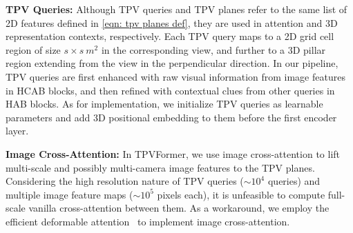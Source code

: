 \documentclass[10pt,twocolumn,letterpaper]{article}
\begin{document}
\textbf{TPV Queries:}
Although TPV queries and TPV planes refer to the same list of 2D features defined in \eqref{eqn: tpv planes def}, they are used in attention and 3D representation contexts, respectively.
Each TPV query maps to a 2D grid cell region of size $s\times s\ m^2$ in the corresponding view, and further to a 3D pillar region extending from the view in the perpendicular direction.
In our pipeline, TPV queries are first enhanced with raw visual information from image features in HCAB blocks, and then refined with contextual clues from other queries in HAB blocks.
As for implementation, we initialize TPV queries as learnable parameters and add 3D positional embedding to them before the first encoder layer.

\textbf{Image Cross-Attention:}
In TPVFormer, we use image cross-attention to lift multi-scale and possibly multi-camera image features to the TPV planes.
Considering the high resolution nature of TPV queries ($\sim 10^4$ queries) and multiple image feature maps ($\sim 10^5$ pixels each), it is unfeasible to compute full-scale vanilla cross-attention between them.
As a workaround, we employ the efficient deformable attention~\cite{deformable_DETR,dcn} to implement image cross-attention.
\end{document}
